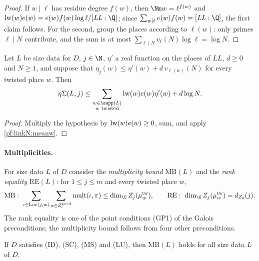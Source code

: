 \begin{proof}
If $w\mid\ell$ has residue degree $f(w)$, then $\Nm w=\ell^{f(w)}$ and $\linkNlw(w)e(w)=e(w)f(w)\log\ell/[\mathit{LL}:\Q]$;
since $\sum_{w\mid\ell}e(w)f(w)=[\mathit{LL}:\Q]$, the first claim follows. For the second, group the places according to
$\ell(w)$: only primes $\ell\mid N$ contribute, and the sum is at most $\sum_{\ell\mid N}v_\ell(N)\log\ell=\log N$.
\end{proof}

\begin{lemma}\label{pf:linkN:etaSumAdd}
Let $L$ be size data for $D$, $j\in\N$, $\eta'$ a real function on the places of $\mathit{LL}$, $d\ge0$ and $N\ge1$, and
suppose that $\eta_j(w)\le\eta'(w)+d\,v_{\ell(w)}(N)$ for every twisted place $w$. Then
\[
\linkNeS(L,j)\le\sum_{\substack{w\in\supp(L)\\ w\text{ twisted}}}\linkNlw(w)e(w)\eta'(w)+d\log N.
\]
\end{lemma}

\begin{proof}
Multiply the hypothesis by $\mathrm{lw}(w)e(w)\ge0$, sum, and apply \cref{pf:linkN:meanw}.
\end{proof}

\paragraph{Multiplicities.}
For size data $L$ of $D$ consider the \emph{multiplicity bound} $\mathrm{MB}(L)$ and the \emph{rank equality} $\mathrm{RE}(L)$:
for $1\le j\le m$ and every twisted place $w$,
\[
\mathrm{MB}:\ \sum_{\iota\in\mathrm{Loc}(j,w)}\sum_{\pi\in\linkNgood_\iota}\linkNmult(\iota,\pi)\le\dim_\C Z_j(\mu^{\mathrm{tw}}_w),
\qquad \mathrm{RE}:\ \dim_\C Z_j(\mu^{\mathrm{tw}}_w)=\linkNdZ(j).
\]
The rank equality is one of the point conditions (GP1) of the Galois preconditions; the multiplicity bound follows from four
other preconditions.

\begin{lemma}\label{pf:linkN:multle}
If $D$ satisfies (ID), (SC), (MS) and (LU), then $\mathrm{MB}(L)$ holds for all size data $L$ of $D$.
\end{lemma}

